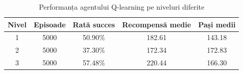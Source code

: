 \begin{table}[H]
\centering
\begin{tabular}{|c|c|c|c|c|}
\hline
\textbf{Nivel} & \textbf{Episoade} & \textbf{Rată succes} & \textbf{Recompensă medie} & \textbf{Pași medii} \\
\hline
1 & 5000 & 50.90\% & 182.61 & 143.18 \\
\hline
2 & 5000 & 37.30\% & 172.34 & 172.83 \\
\hline
3 & 5000 & 57.48\% & 220.44 & 166.30 \\
\hline
\end{tabular}
\caption{Performanța agentului Q-learning pe niveluri diferite}
\label{tab:performanta-niveluri}
\end{table}